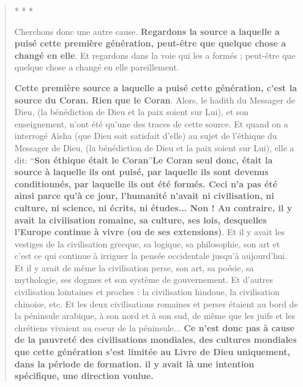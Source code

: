 \begin{quote}
* * *

Cherchons donc une autre cause. \textbf{Regardons la source a laquelle a
puisé cette première génération, peut-être que quelque chose a changé en
elle}. Et regardons dans la voie qui les a formés ; peut-être que
quelque chose a changé en elle pareillement.

\textbf{Cette première source a laquelle a puisé cette génération, c'est
la source du Coran. Rien que le Coran}. Alors, le hadith du Messager de
Dieu, (la bénédiction de Dieu et la paix soient sur Lui), et son
enseignement, n'ont été qu'une des traces de cette source. Et quand on a
interrogé Aïsha (que Dieu soit satisfait d'elle) au sujet de l'éthique
du Messager de Dieu, (la bénédiction de Dieu et la paix soient sur Lui),
elle a dit: ``\textbf{Son éthique était le Coran}''\textbf{Le Coran seul
donc, était la source à laquelle ils ont puisé, par laquelle ils sont
devenus conditionnés, par laquelle ils ont été formés. Ceci n'a pas été
ainsi parce qu'à ce jour, l'humanité n'avait ni civilisation, ni
culture, ni science, ni écrits, ni études... Non ! Au contraire, il y
avait la civilisation romaine, sa culture, ses lois, desquelles l'Europe
continue à vivre (ou de ses extensions)}. Et il y avait les vestiges de
la civilisation grecque, sa logique, sa philosophie, son art et c'est ce
qui continue à irriguer la pensée occidentale jusqu'à aujourd'hui. Et il
y avait de même la civilisation perse, son art, sa poésie, sa
mythologie, ses dogmes et son système de gouvernement. Et d'autres
civilisation lointaines et proches : la civilisation hindoue, la
civilisation chinoise, etc. Et les deux civilisations romaines et perses
étaient au bord de la péninsule arabique, à son nord et à son sud, de
même que les juifs et les chrétiens vivaient au coeur de la péninsule...
\textbf{Ce n'est donc pas à cause de la pauvreté des civilisations
mondiales, des cultures mondiales que cette génération s'est limitée au
Livre de Dieu uniquement, dans la période de formation. il y avait là
une intention spécifique, une direction voulue.}


\end{quote}
